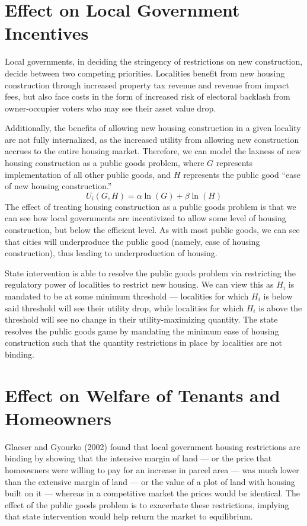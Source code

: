 \documentclass[12pt]{extarticle}
\newlength\tindent
\renewcommand{\indent}{\hspace*{\tindent}}
\begin{document}
  \section*{Effect on Local Government Incentives}%
  Local governments, in deciding the stringency of restrictions on new construction, decide between two competing priorities. Localities benefit from new housing construction through increased property tax revenue and revenue from impact fees,\supercite{impact_fees} but also face costs in the form of increased risk of electoral backlash from owner-occupier voters who may see their asset value drop.\supercite{owner_nimbys}

  \indent Additionally, the benefits of allowing new housing construction in a given locality are not fully internalized, as the increased utility from allowing new construction accrues to the entire housing market. Therefore, we can model the laxness of new housing construction as a public goods problem, where $G$ represents implementation of all other public goods, and $H$ represents the public good ``ease of new housing construction.''
  \[U_i(G,H) = \alpha \ln(G) + \beta \ln(H)\]
  \indent The effect of treating housing construction as a public goods problem is that we can see how local governments are incentivized to allow some level of housing construction, but below the efficient level. As with most public goods, we can see that cities will underproduce the public good (namely, ease of housing construction), thus leading to underproduction of housing.

  \indent State intervention is able to resolve the public goods problem via restricting the regulatory power of localities to restrict new housing. We can view this as $H_i$ is mandated to be at some minimum threshold --- localities for which $H_i$ is below said threshold will see their utility drop, while localities for which $H_i$ is above the threshold will see no change in their utility-maximizing quantity. The state resolves the public goods game by mandating the minimum ease of housing construction such that the quantity restrictions in place by localities are not binding.
  \section*{Effect on Welfare of Tenants and Homeowners}%
  Glaeser and Gyourko (2002) found that local government housing restrictions are binding by showing that the intensive margin of land --- or the price that homeowners were willing to pay for an increase in parcel area --- was much lower than the extensive margin of land --- or the value of a plot of land with housing built on it --- whereas in a competitive market the prices would be identical.\supercite{glaeser_gyourko_2002} The effect of the public goods problem is to exacerbate these restrictions, implying that state intervention would help return the market to equilibrium.
\end{document}
